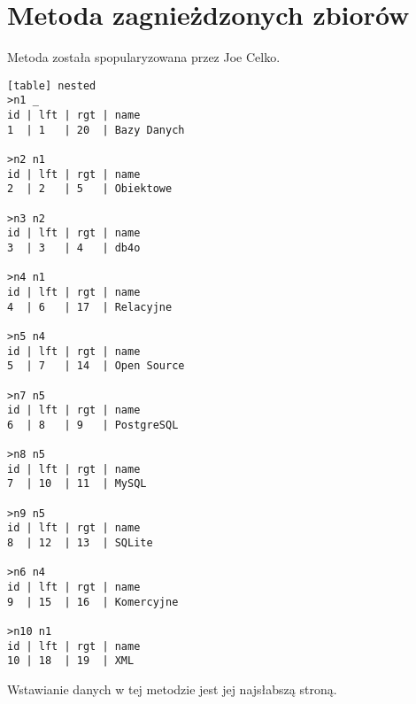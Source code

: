 \section{Metoda zagnieżdzonych zbiorów}

Metoda została spopularyzowana przez Joe Celko\cite{celko-sql}.







\begin{verbatim}[table] nested
>n1 _
id | lft | rgt | name
1  | 1   | 20  | Bazy Danych

>n2 n1
id | lft | rgt | name
2  | 2   | 5   | Obiektowe

>n3 n2
id | lft | rgt | name
3  | 3   | 4   | db4o

>n4 n1
id | lft | rgt | name
4  | 6   | 17  | Relacyjne

>n5 n4
id | lft | rgt | name
5  | 7   | 14  | Open Source

>n7 n5
id | lft | rgt | name
6  | 8   | 9   | PostgreSQL

>n8 n5
id | lft | rgt | name
7  | 10  | 11  | MySQL

>n9 n5
id | lft | rgt | name
8  | 12  | 13  | SQLite

>n6 n4
id | lft | rgt | name
9  | 15  | 16  | Komercyjne

>n10 n1
id | lft | rgt | name
10 | 18  | 19  | XML

\end{verbatim}





Wstawianie danych w tej metodzie jest jej najsłabszą stroną.






